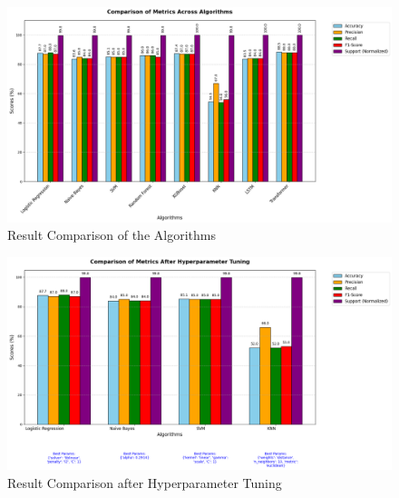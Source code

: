 \pagebreak

\begin{figure}[h!]  
    \centering
    \includegraphics[width=1.0\textwidth]{Images/ML GRAPH 1.png}  
    \caption{Result Comparison of the Algorithms}
    \label{dfdl145}  %
\end{figure}

\begin{figure}[h!]  
    \centering
    \includegraphics[width=1.0\textwidth]{Images/ML GRAPH 2 HT.png}  
    \caption{Result Comparison after Hyperparameter Tuning}
    \label{dfdl123}  %
\end{figure}

\pagebreak

